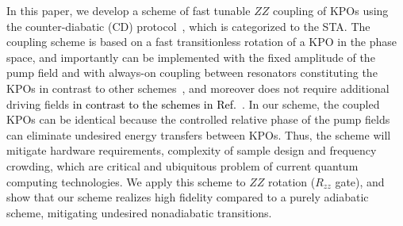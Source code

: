 \documentclass[%
 reprint,
 amsmath,amssymb,
 aps,
pra,
]{revtex4-2}
\begin{document}
In this paper, we develop a scheme of fast tunable $ZZ$ coupling of KPOs using the counter-diabatic (CD) protocol~\cite{Rice2003,Masuda2016}, which is categorized to the STA.
The coupling scheme is based on a fast transitionless rotation of a KPO in the phase space, 
and importantly can be implemented with the fixed amplitude of the pump field and with always-on coupling between resonators constituting the KPOs in contrast to other schemes~\cite{Goto2016b,Puri2017b,Puri2020},
and moreover does not require additional driving fields \textcolor{black}{ in contrast to the schemes in Ref.~\cite{Darmawan2021,Chono2022}}.
In our scheme, the coupled KPOs can be identical because the controlled relative phase of the pump fields can eliminate undesired energy transfers between KPOs. Thus, the scheme will mitigate hardware requirements, complexity of sample design and frequency crowding, which are critical and ubiquitous problem of current quantum computing technologies.
We apply this scheme to $ZZ$ rotation ($R_{zz}$ gate), and show that our scheme realizes high fidelity compared to a purely adiabatic scheme,  mitigating undesired nonadiabatic transitions.

\end{document}
